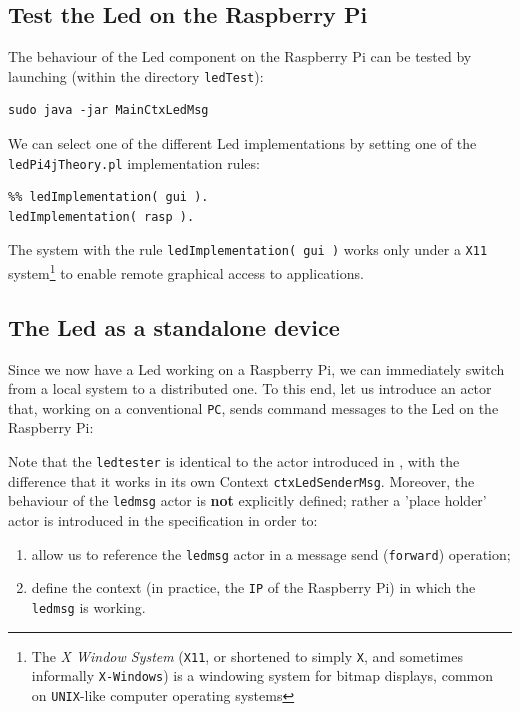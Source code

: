 \subsection{Test the Led on the Raspberry Pi}
The behaviour of the Led component on the Raspberry Pi can be tested by launching (within the directory \texttt{ledTest}):

\begin{Verbatim}[fontsize=\scriptsize, frame=single , label=Launch the Led test]
sudo java -jar MainCtxLedMsg
\end{Verbatim}

We can select one of the different Led implementations by setting one of the \texttt{ledPi4jTheory.pl} implementation rules:

\begin{Verbatim}[fontsize=\scriptsize, frame=single , label=Select the Led implementation]
%% ledImplementation( mock ).
%% ledImplementation( gui ).
ledImplementation( rasp ).
\end{Verbatim}

The system with the rule \texttt{ledImplementation( gui )} works only under a \texttt{X11} system\footnote{The\textit{ X Window System} (\texttt{X11}, or shortened to simply \texttt{X}, and sometimes informally \texttt{X-Windows}) is a windowing system for bitmap displays, common on \texttt{UNIX}-like computer operating systems} to enable remote graphical access to applications.

\subsection{The Led as a standalone device}
Since we now have a Led working on a Raspberry Pi, we can immediately switch from a local system to a distributed one. To this end, let us introduce an actor that, working on a conventional \texttt{PC}, sends command messages to the Led on the Raspberry Pi:



Note that the \texttt{ledtester} is identical to the actor introduced in  , with the difference that it works in its own Context \texttt{ctxLedSenderMsg}. Moreover, the behaviour of the \texttt{ledmsg} actor is \textbf{not} explicitly defined; rather a 'place holder' actor is introduced in the specification in order to:
\begin{enumerate}
\item allow us to reference the \texttt{ledmsg} actor in a message send (\texttt{forward}) operation;
\item define the context (in practice, the \texttt{IP} of the Raspberry Pi) in which the \texttt{ledmsg} is working.
\end{enumerate}

